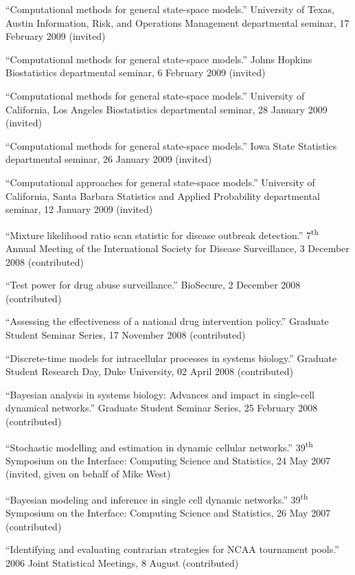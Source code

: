 \documentclass[overlapped,line]{res}
\begin{document}
\begin{resume}
{``Computational methods for general state-space models.'' University of Texas, Austin Information, Risk, and Operations Management departmental seminar, 17 February 2009 (invited)



``Computational methods for general state-space models.'' Johns Hopkins Biostatistics departmental seminar, 6 February 2009 (invited)

``Computational methods for general state-space models.'' University of California, Los Angeles Biostatistics departmental seminar, 28 January 2009 (invited)

``Computational methods for general state-space models.'' Iowa State Statistics  departmental seminar, 26 January 2009 (invited)

``Computational approaches for general state-space models.'' University of California, Santa Barbara Statistics and Applied Probability departmental seminar, 12 January 2009 (invited)




``Mixture likelihood ratio scan statistic for disease outbreak detection.'' 7\textsuperscript{th} Annual Meeting of the International Society for Disease Surveillance, 3 December 2008 (contributed)

``Test power for drug abuse surveillance.'' BioSecure, 2 December 2008 (contributed)


``Assessing the effectiveness of a national drug intervention policy.'' Graduate Student Seminar Series, 17 November 2008 (contributed)



``Discrete-time models for intracellular processes in systems biology.'' Graduate Student Research Day, Duke University, 02 April 2008 (contributed)

``Bayesian analysis in systems biology: Advances and impact in single-cell dynamical networks.'' Graduate Student Seminar Series, 25 February 2008 (contributed)

``Stochastic modelling and estimation in dynamic cellular networks.'' 39\textsuperscript{th} Symposium on the Interface: Computing Science and Statistics, 24 May 2007 (invited, given on behalf of Mike West)

``Bayesian modeling and inference in single cell dynamic networks.'' 39\textsuperscript{th} Symposium on the Interface: Computing Science and Statistics, 26 May 2007 (contributed)


``Identifying and evaluating contrarian strategies for NCAA tournament pools.'' 2006 Joint Statistical Meetings, 8 August (contributed)

}
\end{resume}
\end{document}
